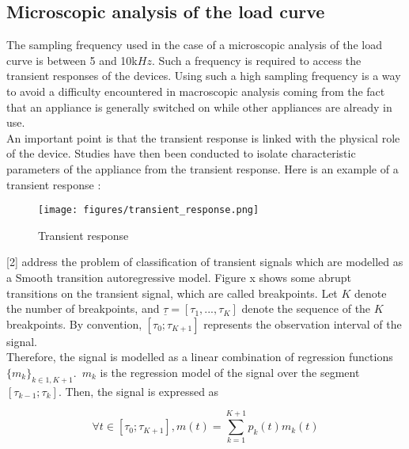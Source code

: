
\subsection{Microscopic analysis of the load curve}
The sampling frequency used in the case of a microscopic analysis of the load curve is between 5 and 10k$Hz$. Such a frequency is required to access the transient responses of the devices. Using such a high sampling frequency is a way to avoid a difficulty encountered in macroscopic analysis coming from the fact that an appliance is generally switched on while other appliances are already in use. 
\\

An important point is that the transient response is linked with the physical role of the device. Studies have then been conducted to isolate characteristic parameters of the appliance from the transient response. Here is an example of a transient response :
\\

\begin{figure}[H]
\centering
\texttt{[image: figures/transient\_response.png]}
\caption{Transient response}
\label{fig:boxDescription}
\end{figure}



[2] address the problem of classification of transient signals which are modelled as a Smooth transition autoregressive model. Figure x shows some abrupt transitions on the transient signal, which are called breakpoints. Let $K$ denote the number of breakpoints, and $\underline{\tau} = [\tau_1,...,\tau_K]$ denote the sequence of the $K$ breakpoints. By convention, $[\tau_0;\tau_{K+1}]$ represents the observation interval of the signal. 
\\

 Therefore, the signal is modelled as a linear combination of regression functions $\{m_k\}_{k\in{1,K+1}}$.~$m_k$ is the regression model of the signal over the segment $[\tau_{k-1};\tau_{k}]$. Then, the signal is expressed as

\begin{equation}
\forall t\in [\tau_0;\tau_{K+1}],m(t)= \sum_{k=1}^{K+1}p_k(t)m_k(t)
\end{equation}

